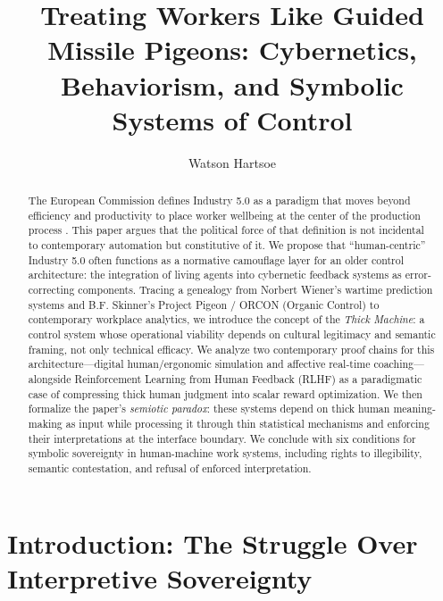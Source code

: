 \documentclass[runningheads]{llncs}
\begin{document}
\title{Treating Workers Like Guided Missile Pigeons: Cybernetics, Behaviorism, and Symbolic Systems of Control}

\author{Watson Hartsoe}

\maketitle

\begin{abstract}
The European Commission defines Industry 5.0 as a paradigm that moves beyond efficiency and productivity to place worker wellbeing at the center of the production process \cite{breque2021industry}. This paper argues that the political force of that definition is not incidental to contemporary automation but constitutive of it. We propose that ``human-centric'' Industry 5.0 often functions as a normative camouflage layer for an older control architecture: the integration of living agents into cybernetic feedback systems as error-correcting components. Tracing a genealogy from Norbert Wiener's wartime prediction systems and B.F. Skinner's Project Pigeon / ORCON (Organic Control) to contemporary workplace analytics, we introduce the concept of the \emph{Thick Machine}: a control system whose operational viability depends on cultural legitimacy and semantic framing, not only technical efficacy. We analyze two contemporary proof chains for this architecture---digital human/ergonomic simulation and affective real-time coaching---alongside Reinforcement Learning from Human Feedback (RLHF) as a paradigmatic case of compressing thick human judgment into scalar reward optimization. We then formalize the paper's \emph{semiotic paradox}: these systems depend on thick human meaning-making as input while processing it through thin statistical mechanisms and enforcing their interpretations at the interface boundary. We conclude with six conditions for symbolic sovereignty in human-machine work systems, including rights to illegibility, semantic contestation, and refusal of enforced interpretation.

\end{abstract}

\section{Introduction: The Struggle Over Interpretive Sovereignty}
\end{document}
